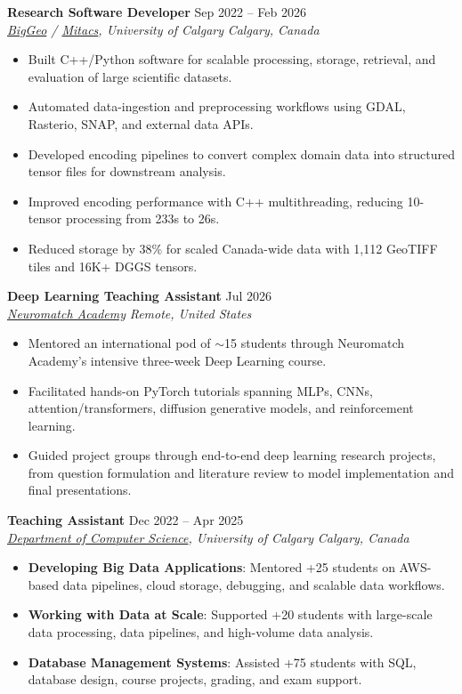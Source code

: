 \documentclass[a4paper,10pt]{article}
\newcommand{\resumeSubheading}[4]{
    \textbf{#1} \hfill #2 \\
    \textit{#3} \hfill \textit{#4}
}
\begin{document}
\resumeSubheading
{Research Software Developer}
{Sep 2022 -- Feb 2026}
{\href{https://biggeo.com}{BigGeo} / \href{https://www.mitacs.ca/}{Mitacs}, University of Calgary}
{Calgary, Canada}
\begin{itemize}[leftmargin=0.25in]
    \item Built C++/Python software for scalable processing, storage, retrieval, and evaluation of large scientific datasets.
    \item Automated data-ingestion and preprocessing workflows using GDAL, Rasterio, SNAP, and external data APIs.
    \item Developed encoding pipelines to convert complex domain data into structured tensor files for downstream analysis.
    \item Improved encoding performance with C++ multithreading, reducing 10-tensor processing from 233s to 26s.
    \item Reduced storage by 38\% for scaled Canada-wide data with 1,112 GeoTIFF tiles and 16K+ DGGS tensors.
\end{itemize}

\resumeSubheading
{Deep Learning Teaching Assistant}
{Jul 2026}
{\href{https://neuromatch.io/}{Neuromatch Academy}}
{Remote, United States}
\begin{itemize}[leftmargin=0.25in]
    \item Mentored an international pod of $\sim$15 students through Neuromatch Academy's intensive three-week Deep Learning course.
    \item Facilitated hands-on PyTorch tutorials spanning MLPs, CNNs, attention/transformers, diffusion generative models, and reinforcement learning.
    \item Guided project groups through end-to-end deep learning research projects, from question formulation and literature review to model implementation and final presentations.
\end{itemize}

\resumeSubheading
{Teaching Assistant}
{Dec 2022 -- Apr 2025}
{\href{https://science.ucalgary.ca/computer-science} {Department of Computer Science}, University of Calgary}
{Calgary, Canada}
\begin{itemize}[leftmargin=0.25in]
    \item \textbf{Developing Big Data Applications}: Mentored +25 students on AWS-based data pipelines, cloud storage, debugging, and scalable data workflows.
    \item \textbf{Working with Data at Scale}: Supported +20 students with large-scale data processing, data pipelines, and high-volume data analysis.
    \item \textbf{Database Management Systems}: Assisted +75 students with SQL, database design, course projects, grading, and exam support.
\end{itemize}
\end{document}
